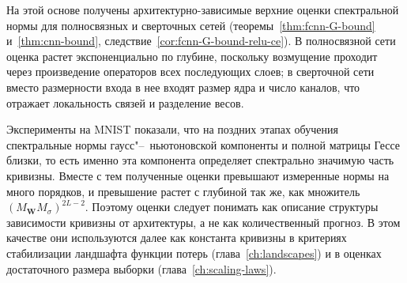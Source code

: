 На этой основе получены архитектурно-зависимые верхние оценки спектральной нормы для полносвязных и сверточных сетей (теоремы~\ref{thm:fcnn-G-bound} и~\ref{thm:cnn-bound}, следствие~\ref{cor:fcnn-G-bound-relu-ce}). В полносвязной сети оценка растет экспоненциально по глубине, поскольку возмущение проходит через произведение операторов всех последующих слоев; в сверточной сети вместо размерности входа в нее входят размер ядра и число каналов, что отражает локальность связей и разделение весов.

Эксперименты на MNIST показали, что на поздних этапах обучения спектральные нормы гаусс"--~ньютоновской компоненты и полной матрицы Гессе близки, то есть именно эта компонента определяет спектрально значимую часть кривизны. Вместе с тем полученные оценки превышают измеренные нормы на много порядков, и превышение растет с глубиной так же, как множитель $(M_{\mathbf W}M_\sigma)^{2L-2}$. Поэтому оценки следует понимать как описание структуры зависимости кривизны от архитектуры, а не как количественный прогноз. В этом качестве они используются далее как константа кривизны в критериях стабилизации ландшафта функции потерь (глава~\ref{ch:landscapes}) и в оценках достаточного размера выборки (глава~\ref{ch:scaling-laws}).
